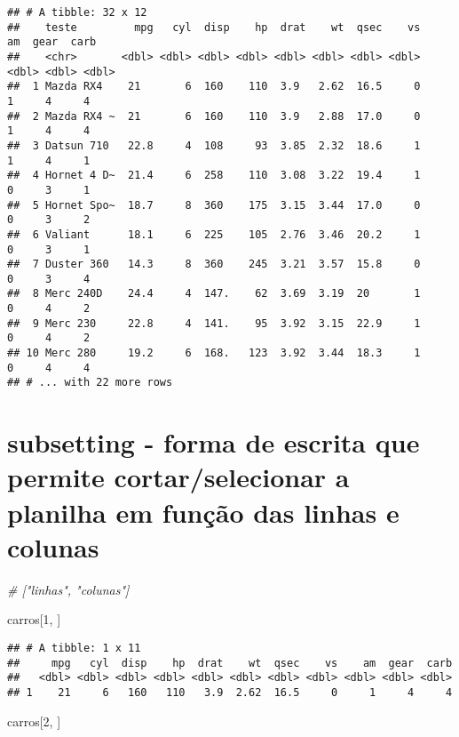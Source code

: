 \documentclass[]{book}
\newenvironment{Shaded}{\begin{snugshade}}{\end{snugshade}}
\newcommand{\CommentTok}[1]{\textcolor[rgb]{0.56,0.35,0.01}{\textit{#1}}}
\newcommand{\DecValTok}[1]{\textcolor[rgb]{0.00,0.00,0.81}{#1}}
\newcommand{\NormalTok}[1]{#1}
\begin{document}
\begin{verbatim}
## # A tibble: 32 x 12
##    teste         mpg   cyl  disp    hp  drat    wt  qsec    vs    am  gear  carb
##    <chr>       <dbl> <dbl> <dbl> <dbl> <dbl> <dbl> <dbl> <dbl> <dbl> <dbl> <dbl>
##  1 Mazda RX4    21       6  160    110  3.9   2.62  16.5     0     1     4     4
##  2 Mazda RX4 ~  21       6  160    110  3.9   2.88  17.0     0     1     4     4
##  3 Datsun 710   22.8     4  108     93  3.85  2.32  18.6     1     1     4     1
##  4 Hornet 4 D~  21.4     6  258    110  3.08  3.22  19.4     1     0     3     1
##  5 Hornet Spo~  18.7     8  360    175  3.15  3.44  17.0     0     0     3     2
##  6 Valiant      18.1     6  225    105  2.76  3.46  20.2     1     0     3     1
##  7 Duster 360   14.3     8  360    245  3.21  3.57  15.8     0     0     3     4
##  8 Merc 240D    24.4     4  147.    62  3.69  3.19  20       1     0     4     2
##  9 Merc 230     22.8     4  141.    95  3.92  3.15  22.9     1     0     4     2
## 10 Merc 280     19.2     6  168.   123  3.92  3.44  18.3     1     0     4     4
## # ... with 22 more rows
\end{verbatim}

\hypertarget{subsetting---forma-de-escrita-que-permite-cortarselecionar-a-planilha-em-funuxe7uxe3o-das-linhas-e-colunas}{%
\section{subsetting - forma de escrita que permite cortar/selecionar a planilha em função das linhas e colunas}\label{subsetting---forma-de-escrita-que-permite-cortarselecionar-a-planilha-em-funuxe7uxe3o-das-linhas-e-colunas}}

\begin{Shaded}
\begin{Highlighting}[]
\CommentTok{# ["linhas", "colunas"]}

\NormalTok{carros[}\DecValTok{1}\NormalTok{, ]}
\end{Highlighting}
\end{Shaded}

\begin{verbatim}
## # A tibble: 1 x 11
##     mpg   cyl  disp    hp  drat    wt  qsec    vs    am  gear  carb
##   <dbl> <dbl> <dbl> <dbl> <dbl> <dbl> <dbl> <dbl> <dbl> <dbl> <dbl>
## 1    21     6   160   110   3.9  2.62  16.5     0     1     4     4
\end{verbatim}

\begin{Shaded}
\begin{Highlighting}[]
\NormalTok{carros[}\DecValTok{2}\NormalTok{, ]}
\end{Highlighting}
\end{Shaded}
\end{document}
